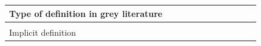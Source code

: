 \documentclass[english, 12pt, a4paper, sci, utf8, a-1b, online]{aaltothesis}
\begin{document}
\begin{center}
\begin{longtable}{p{0.3\linewidth}p{0.6\linewidth}}
    \multicolumn{2}{l}{\textbf{Type of definition in grey literature}}                                                                                                                                                                                                                                                                                                                                                                                                                                                                                                                                                                                                                                                                                                                                                                                                                                                                                                            \\
    \hline                                                                                                                                                                                                                                                                                                                                                                                                                                                                                                                                                                                                                                                                                                                                                                                                                                                                                                                              \\
    Implicit definition & \newline \textcite{great-dx-and-the-people-who-make-them} \newline \textcite{heroku-dx} \newline \textcite{api-developer-experience-dx-resources} \newline \textcite{developer-experience-sanity}                                                                                                                                                                                                                                                                                                                                                                                                                                                                                                                                                                                                                                                                                                             \\

\end{longtable}
\end{center}
\end{document}
